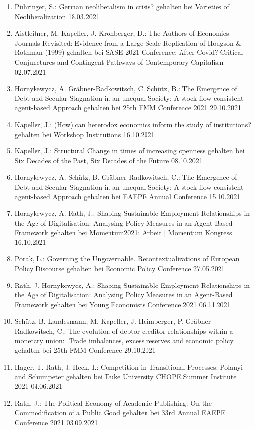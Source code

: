 \begin{enumerate}
	\item Pühringer, S.: German neoliberalism in crisis? gehalten bei Varieties of Neoliberalization 18.03.2021
	\item Aistleitner, M. Kapeller, J. Kronberger, D.: The Authors of Economics Journals Revisited: Evidence from a Large-Scale Replication of Hodgson \& Rothman (1999) gehalten bei SASE 2021 Conference: After Covid? Critical Conjunctures and Contingent Pathways of Contemporary Capitalism 02.07.2021
	\item Hornykewycz, A. Gräbner-Radkowitsch, C. Schütz, B.: The Emergence of Debt and Secular Stagnation in an unequal Society: A stock-flow consistent agent-based Approach gehalten bei 25th FMM Conference 2021 29.10.2021
	\item Kapeller, J.: (How) can heterodox economics inform the study of institutions? gehalten bei Workshop \glqq Institutions\grqq{} 16.10.2021
	\item Kapeller, J.: Structural Change in times of increasing openness gehalten bei Six Decades of the Past, Six Decades of the Future 08.10.2021
	\item Hornykewycz, A. Schütz, B. Gräbner-Radkowitsch, C.: The Emergence of Debt and Secular Stagnation in an unequal Society: A stock-flow consistent agent-based Approach gehalten bei EAEPE Annual Conference 15.10.2021
	\item Hornykewycz, A. Rath, J.: Shaping Sustainable Employment Relationships in the Age of Digitalisation: Analysing Policy Measures in an Agent-Based Framework gehalten bei Momentum2021: Arbeit | Momentum Kongress 16.10.2021
	\item Porak, L.: Governing the Ungovernable. Recontextualizations of European Policy Discourse gehalten bei Economic Policy Conference 27.05.2021
	\item Rath, J. Hornykewycz, A.: Shaping Sustainable Employment Relationships in the Age of Digitalisation: Analysing Policy Measures in an Agent-Based Framework gehalten bei Young Economists Conference 2021 06.11.2021
	\item Schütz, B. Landesmann, M. Kapeller, J. Heimberger, P. Gräbner-Radkowitsch, C.: The evolution of debtor-creditor relationships within a monetary union:  Trade imbalances, excess reserves and economic policy gehalten bei 25th FMM Conference 29.10.2021
	\item Hager, T. Rath, J. Heck, I.: Competition in Transitional Processes: Polanyi and Schumpeter gehalten bei Duke University CHOPE Summer Institute 2021 04.06.2021
	\item Rath, J.: The Political Economy of Academic Publishing: On the Commodification of a Public Good gehalten bei 33rd Annual EAEPE Conference 2021 03.09.2021

\end{enumerate}

